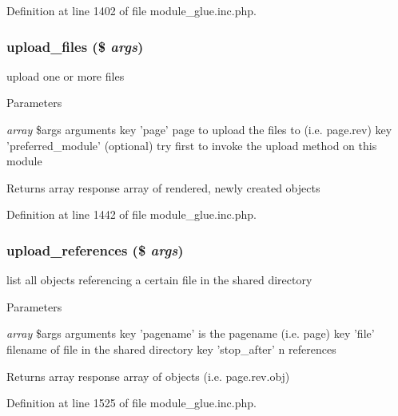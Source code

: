 Definition at line 1402 of file module\_\-glue.inc.php.

\hypertarget{module__glue_8inc_8php_a43746135e67f614d79317029aced064b}{
\subsubsection[{upload\_\-files}]{\setlength{\rightskip}{0pt plus 5cm}upload\_\-files (\$ {\em args})}}
\label{module__glue_8inc_8php_a43746135e67f614d79317029aced064b}
upload one or more files


\begin{DoxyParams}{Parameters}
\item[{\em array}]\$args arguments key 'page' page to upload the files to (i.e. page.rev) key 'preferred\_\-module' (optional) try first to invoke the upload method on this module \end{DoxyParams}
\begin{DoxyReturn}{Returns}
array response array of rendered, newly created objects 
\end{DoxyReturn}


Definition at line 1442 of file module\_\-glue.inc.php.

\hypertarget{module__glue_8inc_8php_a2099347b9bdf5a5973a13e5f7a4be933}{
\subsubsection[{upload\_\-references}]{\setlength{\rightskip}{0pt plus 5cm}upload\_\-references (\$ {\em args})}}
\label{module__glue_8inc_8php_a2099347b9bdf5a5973a13e5f7a4be933}
list all objects referencing a certain file in the shared directory


\begin{DoxyParams}{Parameters}
\item[{\em array}]\$args arguments key 'pagename' is the pagename (i.e. page) key 'file' filename of file in the shared directory key 'stop\_\-after' n references \end{DoxyParams}
\begin{DoxyReturn}{Returns}
array response array of objects (i.e. page.rev.obj) 
\end{DoxyReturn}


Definition at line 1525 of file module\_\-glue.inc.php.

